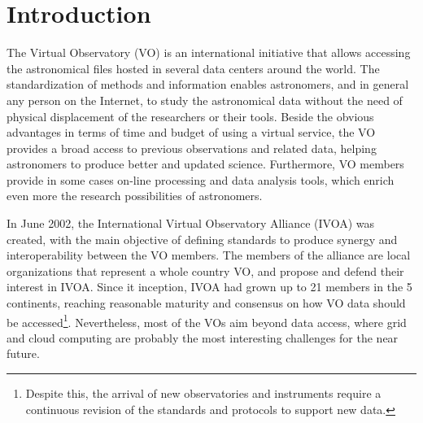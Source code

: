 \section{Introduction}
The Virtual Observatory (VO) \cite{Borne2013,HanischQuinn2003} is an
international initiative that allows accessing the astronomical files hosted in
several data centers around the world. The standardization of methods and information 
enables astronomers, and in general any person on the Internet, to study the 
astronomical data without the need of physical displacement of the researchers 
or their tools. Beside the obvious advantages in terms of time and budget of 
using a virtual service, the VO provides a broad access to previous observations
and related data, helping astronomers to produce better and updated
science. Furthermore, VO members provide in some cases on-line processing and
data analysis tools, which enrich even more the research possibilities of
astronomers. 

In June 2002, the International Virtual Observatory Alliance (IVOA)
\cite{website:ivoa-home} was created, with the main objective of
defining standards to produce synergy and interoperability between the
VO members. The members of the alliance are local organizations that represent
a whole country VO, and propose and defend their interest in IVOA.
Since it inception, IVOA had grown up to 21 members in the 5 continents,
reaching reasonable maturity and consensus on how VO data should be
accessed\footnote{Despite this, the arrival of new observatories and instruments 
require a continuous revision of the standards and protocols to support new
data.}.
Nevertheless, most of the VOs aim beyond data access, where grid and cloud computing
are probably the most interesting challenges for the near future. 


